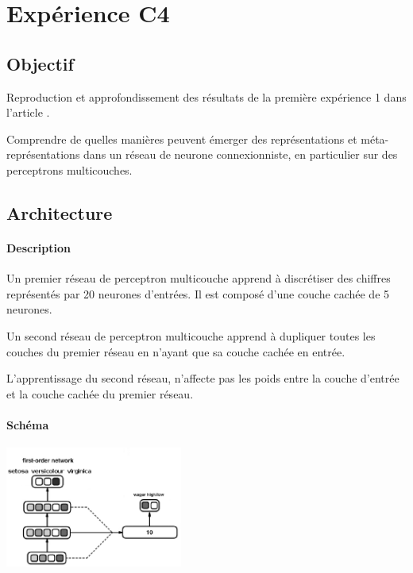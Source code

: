 \section{Expérience C4}
  \subsection{Objectif}
    Reproduction et approfondissement des résultats de la première expérience 1 dans l'article 
    \cite{Cleeremans_2007}. 

  
  
    Comprendre de quelles manières peuvent émerger des représentations et méta-représentations dans 
    un réseau de neurone connexionniste, en particulier sur des perceptrons multicouches.
  
  
  \subsection{Architecture}
    \paragraph{Description}
      Un premier réseau de perceptron multicouche apprend à discrétiser des chiffres représentés
      par 20 neurones d'entrées. Il est composé d'une couche cachée de 5 neurones.
      
      Un second réseau de perceptron multicouche apprend à dupliquer toutes les couches du premier
      réseau en n'ayant que sa couche cachée en entrée.
      
      L'apprentissage du second réseau, n'affecte pas les poids entre la couche d'entrée et la 
      couche cachée du premier réseau.

    \paragraph{Schéma}
      \begin{center}
	\includegraphics[width=220px]{data/expC4/schema.png}
      \end{center}
      
